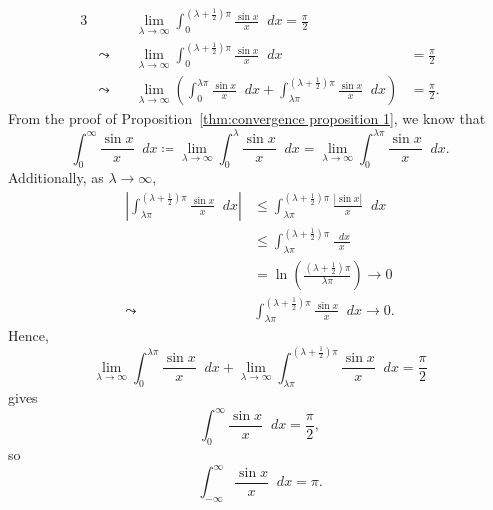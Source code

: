 \documentclass[a4paper]{article}
\newcommand*\diff{\mathop{}\!d} %
\theoremstyle{definition}
\begin{document}
\begin{alignat*}{3}
     &                & \lim_{\lambda \to \infty} \int_{0}^{\left(\lambda  + \frac{1}{2}\right) \pi} \frac{\sin x}{x} \diff x  = \frac{\pi}{2}                                                                             \\
     & \leadsto \quad & \lim_{\lambda \to \infty} \int_{0}^{\left(\lambda  + \frac{1}{2}\right) \pi} \frac{\sin x}{x} \diff x                                                                           & = \frac{\pi}{2}  \\
     & \leadsto \quad & \lim_{\lambda \to \infty} \left(\int_{0}^{\lambda \pi} \frac{\sin x}{x} \diff x + \int_{\lambda \pi}^{\left(\lambda  + \frac{1}{2}\right) \pi} \frac{\sin x}{x} \diff x \right) & = \frac{\pi}{2}.
\end{alignat*}
From the proof of Proposition~\ref{thm:convergence proposition 1}, we know that
\begin{equation*}
    \int_{0}^{\infty} \frac{\sin x}{x} \diff x \coloneq \lim_{\lambda \to \infty} \int_{0}^{\lambda} \frac{\sin x}{x} \diff x = \lim_{\lambda \to \infty} \int_{0}^{\lambda \pi} \frac{\sin x}{x} \diff x.
\end{equation*}
Additionally, as $\lambda \to \infty$,
\begin{align*}
    \left|\int_{\lambda \pi}^{\left(\lambda  + \frac{1}{2}\right) \pi} \frac{\sin x}{x} \diff x \right| & \leq \int_{\lambda \pi}^{\left(\lambda  + \frac{1}{2}\right) \pi} \frac{|\sin x|}{x} \diff x \\
                                                                                                        & \leq \int_{\lambda \pi}^{\left(\lambda  + \frac{1}{2}\right) \pi} \frac{\diff x}{x}          \\
                                                                                                        & = \ln \left(\frac{\left(\lambda  + \frac{1}{2}\right) \pi}{\lambda \pi}\right) \to 0         \\
    \leadsto \quad                                                                                      & \int_{\lambda \pi}^{\left(\lambda  + \frac{1}{2}\right) \pi} \frac{\sin x}{x} \diff x \to 0.
\end{align*}
Hence,
\begin{equation*}
    \lim_{\lambda \to \infty} \int_{0}^{\lambda \pi} \frac{\sin x}{x} \diff x + \lim_{\lambda \to \infty} \int_{\lambda \pi}^{\left(\lambda  + \frac{1}{2}\right) \pi} \frac{\sin x}{x} \diff x = \frac{\pi}{2}
\end{equation*}
gives
\begin{equation*}
    \int_{0}^{\infty} \frac{\sin x}{x} \diff x = \frac{\pi}{2},
\end{equation*}
so
\begin{equation*}
    \int_{-\infty}^{\infty} \frac{\sin x}{x} \diff x = \pi.
\end{equation*}
\end{document}
